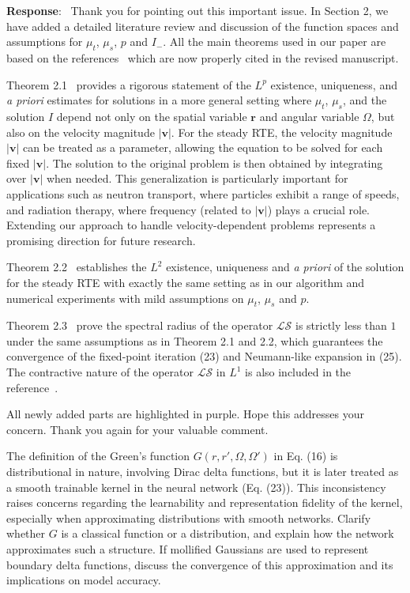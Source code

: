\documentclass[12pt]{article}
\newcounter{reviewer}
\newcounter{point}[reviewer]
\renewcommand{\thepoint}{P\,\thereviewer.\arabic{point}}
\newenvironment{point}{\refstepcounter{point} \bigskip \noindent {\textbf{[Reviewer~Point~\thepoint]} }  }{\par }
\newenvironment{reply}{\medskip \noindent \textbf{Response}:\  \color{blue}\ignorespaces}{\medskip}
\begin{document}
\begin{reply}
	Thank you for pointing out this important issue.
	In Section 2, we have added a detailed literature review and discussion of the function spaces and assumptions for $\mu_t$, $\mu_s$, $p$ and $I_{-}$. All the main theorems used in our paper are based on the references~\cite{egger2014lp,egger2014stationary} which are now properly cited in the revised manuscript.

	Theorem 2.1~\cite{egger2014lp} provides a rigorous statement of the $L^p$ existence, uniqueness, and \emph{a priori} estimates for solutions in a more general setting where $\mu_t$, $\mu_s$, and the solution $I$ depend not only on the spatial variable $\mathbf{r}$ and angular variable $\Omega$, but also on the velocity magnitude $|\mathbf{v}|$. For the steady RTE, the velocity magnitude $|\mathbf{v}|$ can be treated as a parameter, allowing the equation to be solved for each fixed $|\mathbf{v}|$. The solution to the original problem is then obtained by integrating over $|\mathbf{v}|$ when needed. This generalization is particularly important for applications such as neutron transport, where particles exhibit a range of speeds, and radiation therapy, where frequency (related to $|\mathbf{v}|$) plays a crucial role. Extending our approach to handle velocity-dependent problems represents a promising direction for future research.

	Theorem 2.2~\cite{egger2014stationary} establishes the $L^2$ existence, uniqueness and \emph{a priori} of the solution for the steady RTE with exactly the same setting as in our algorithm and numerical experiments with mild assumptions on $\mu_t$, $\mu_s$ and $p$.

	Theorem 2.3~\cite{egger2014lp} prove the spectral radius of the operator $\mathcal{L}\mathcal{S}$ is strictly less than $1$ under the same assumptions as in Theorem 2.1 and 2.2, which guarantees the convergence of the fixed-point iteration (23) and Neumann-like expansion in (25). The contractive nature of the operator $\mathcal{L}\mathcal{S}$ in $L^1$ is also included in the reference~\cite{egger2014lp}.

	All newly added parts are highlighted in {\color{purple}purple}. Hope this addresses your concern. Thank you again for your valuable comment.
\end{reply}

\begin{point}
	The definition of the Green's function $G(r,r',\Omega,\Omega')$ in Eq. (16) is distributional in nature, involving Dirac delta functions, but it is later treated as a smooth trainable kernel in the neural network (Eq. (23)). This inconsistency raises concerns regarding the learnability and representation
	fidelity of the kernel, especially when approximating distributions with smooth networks. Clarify whether $G$ is a classical function or a distribution, and explain how the network approximates such a structure. If mollified Gaussians are used to represent boundary delta functions, discuss the convergence of this approximation and its implications on model accuracy.
\end{point}
\end{document}
